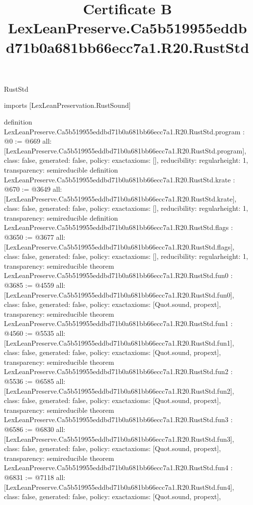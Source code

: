 \begin{lexlean}{RustStd}
\title{Certificate B LexLeanPreserve.Ca5b519955eddbd71b0a681bb66ecc7a1.R20.RustStd}
\begin{coremodule}
imports [LexLeanPreservation.RustSound]

definition LexLeanPreserve.Ca5b519955eddbd71b0a681bb66ecc7a1.R20.RustStd.program : @0 := @669 {
  all: [LexLeanPreserve.Ca5b519955eddbd71b0a681bb66ecc7a1.R20.RustStd.program],
  class: false,
  generated: false,
  policy: exact{axioms: []},
  reducibility: regular{height: 1},
  transparency: semireducible
}
definition LexLeanPreserve.Ca5b519955eddbd71b0a681bb66ecc7a1.R20.RustStd.krate : @670 := @3649 {
  all: [LexLeanPreserve.Ca5b519955eddbd71b0a681bb66ecc7a1.R20.RustStd.krate],
  class: false,
  generated: false,
  policy: exact{axioms: []},
  reducibility: regular{height: 1},
  transparency: semireducible
}
definition LexLeanPreserve.Ca5b519955eddbd71b0a681bb66ecc7a1.R20.RustStd.flags : @3650 := @3677 {
  all: [LexLeanPreserve.Ca5b519955eddbd71b0a681bb66ecc7a1.R20.RustStd.flags],
  class: false,
  generated: false,
  policy: exact{axioms: []},
  reducibility: regular{height: 1},
  transparency: semireducible
}
theorem LexLeanPreserve.Ca5b519955eddbd71b0a681bb66ecc7a1.R20.RustStd.fun0 : @3685 := @4559 {
  all: [LexLeanPreserve.Ca5b519955eddbd71b0a681bb66ecc7a1.R20.RustStd.fun0],
  class: false,
  generated: false,
  policy: exact{axioms: [Quot.sound, propext]},
  transparency: semireducible
}
theorem LexLeanPreserve.Ca5b519955eddbd71b0a681bb66ecc7a1.R20.RustStd.fun1 : @4560 := @5535 {
  all: [LexLeanPreserve.Ca5b519955eddbd71b0a681bb66ecc7a1.R20.RustStd.fun1],
  class: false,
  generated: false,
  policy: exact{axioms: [Quot.sound, propext]},
  transparency: semireducible
}
theorem LexLeanPreserve.Ca5b519955eddbd71b0a681bb66ecc7a1.R20.RustStd.fun2 : @5536 := @6585 {
  all: [LexLeanPreserve.Ca5b519955eddbd71b0a681bb66ecc7a1.R20.RustStd.fun2],
  class: false,
  generated: false,
  policy: exact{axioms: [Quot.sound, propext]},
  transparency: semireducible
}
theorem LexLeanPreserve.Ca5b519955eddbd71b0a681bb66ecc7a1.R20.RustStd.fun3 : @6586 := @6830 {
  all: [LexLeanPreserve.Ca5b519955eddbd71b0a681bb66ecc7a1.R20.RustStd.fun3],
  class: false,
  generated: false,
  policy: exact{axioms: [Quot.sound, propext]},
  transparency: semireducible
}
theorem LexLeanPreserve.Ca5b519955eddbd71b0a681bb66ecc7a1.R20.RustStd.fun4 : @6831 := @7118 {
  all: [LexLeanPreserve.Ca5b519955eddbd71b0a681bb66ecc7a1.R20.RustStd.fun4],
  class: false,
  generated: false,
  policy: exact{axioms: [Quot.sound, propext]},
}
\end{coremodule}
\end{lexlean}
